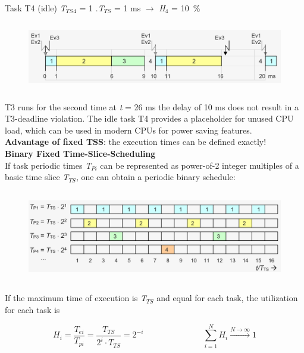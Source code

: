 Task T4 (idle) \textit{T${}_{TS}$}${}_{4}$ = 1 $.$\textit{T${}_{TS}$} = 1 ms $\rightarrow$ \textit{H}${}_{4}$ = 10~\%\\


	\begin{figure}[h]
    \centering
    \includegraphics[width=14cm, height=3cm]{Images/image93.png}
    \label{fig:Fig }
    \end{figure}

T3 runs for the second time at \textit{t} = 26 ms the delay of 10 ms does not result in a T3-deadline violation. The idle task T4 provides a placeholder for unused CPU load, which can be used in modern CPUs for power saving features.\\

\textbf{Advantage of fixed TSS}: the execution times can be defined exactly!\\

{\rot\bf Binary Fixed Time-Slice-Scheduling }\\

If task periodic times \textit{T${}_{Pi}$} can be represented as power-of-2 integer multiples of a basic time slice \textit{T${}_{TS}$}, one can obtain a periodic binary schedule:\\

	\begin{figure}[h]
    \centering
    \includegraphics[width=14cm, height=4cm]{Images/image94.png}
    \label{fig:Fig }
    \end{figure}

If the maximum time of execution is \textit{T}${}_{TS}$ and equal for each task, the utilization for each task is 

\begin{equation}
	 H_{i} =\frac{T_{ei} }{T_{pi} } =\frac{T_{TS} }{2^{i} \cdot T_{TS} } =2^{-i} \hspace{3cm} \sum_{i=1}^N H_{i} \stackrel{N\to \infty }{\longrightarrow} 1
\label{EQ }
\end{equation}

